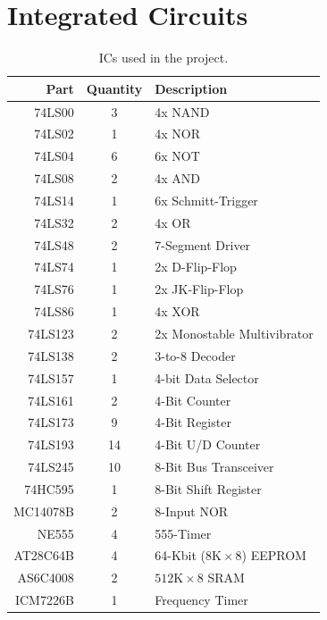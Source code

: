 \section{Integrated Circuits}
\begin{table}[H]
  \centering
  \begin{tabular}{r|c|l}
    Part                     & Quantity & Description \\\hline
    74LS00                   & 3 & 4x NAND \\
    74LS02                   & 1 & 4x NOR \\
    74LS04                   & 6 & 6x NOT \\
    74LS08                   & 2 & 4x AND \\
    74LS14                   & 1 & 6x Schmitt-Trigger \\
    74LS32                   & 2 & 4x OR \\
    74LS48                   & 2 & 7-Segment Driver  \\
    74LS74                   & 1 & 2x D-Flip-Flop  \\
    74LS76                   & 1 & 2x JK-Flip-Flop  \\
    74LS86                   & 1 & 4x XOR  \\
    74LS123                  & 2 & 2x Monostable Multivibrator  \\
    74LS138                  & 2 & 3-to-8 Decoder  \\
    74LS157                  & 1 & 4-bit Data Selector \\
    74LS161                  & 2 & 4-Bit Counter  \\
    74LS173                  & 9 & 4-Bit Register  \\
    74LS193                  & 14 & 4-Bit U/D Counter  \\
    74LS245                  & 10 & 8-Bit Bus Transceiver  \\
    74HC595                  & 1 & 8-Bit Shift Register  \\
    MC14078B                 & 2 & 8-Input NOR  \\
    NE555                    & 4 & 555-Timer \\
    AT28C64B                 & 4 & 64-Kbit ($8\text{K}\times8$) EEPROM  \\
    AS6C4008                 & 2 & $512\text{K}\times8$ SRAM  \\
    ICM7226B                 & 1 & Frequency Timer  \\
  \end{tabular}
  \caption{ICs used in the project.}
  \label{tab:parts}
\end{table}

